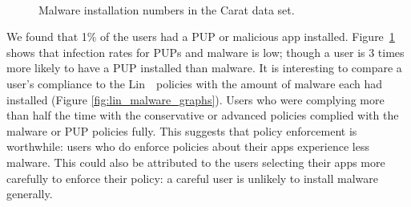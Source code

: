\documentclass[thesis.tex]{subfiles}
\begin{document}
\begin{figure}
  \centering
  \\
  \caption{Malware installation numbers in the Carat data set.}
  \label{fig:malware}
\end{figure}

We found that 1\% of the users had a \ac{PUP} or malicious app
installed.  Figure~\ref{fig:malware} shows that infection rates for
\acp{PUP} and malware is low; though a user is 3 times more likely to
have a \ac{PUP} installed than malware.  It is interesting to compare
a user's compliance to the Lin~\etal~policies with the amount of
malware each had installed (Figure \autoref{fig:lin_malware_graphs}).
Users who were complying more than half the time with the conservative
or advanced policies complied with the malware or \ac{PUP} policies
fully.  This suggests that policy enforcement is worthwhile: users who
do enforce policies about their apps experience less malware.  This
could also be attributed to the users selecting their apps more
carefully to enforce their policy: a careful user is unlikely to
install malware generally.
\end{document}
